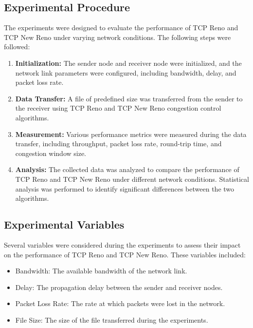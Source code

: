 \documentclass[11pt]{article}
\begin{document}
\subsection{Experimental Procedure}

The experiments were designed to evaluate the performance of TCP Reno and TCP New Reno under varying network conditions. The following steps were followed:

\begin{enumerate}
    \item \textbf{Initialization:} The sender node and receiver node were initialized, and the network link parameters were configured, including bandwidth, delay, and packet loss rate.
    
    \item \textbf{Data Transfer:} A file of predefined size was transferred from the sender to the receiver using TCP Reno and TCP New Reno congestion control algorithms.
    
    \item \textbf{Measurement:} Various performance metrics were measured during the data transfer, including throughput, packet loss rate, round-trip time, and congestion window size.
    
    \item \textbf{Analysis:} The collected data was analyzed to compare the performance of TCP Reno and TCP New Reno under different network conditions. Statistical analysis was performed to identify significant differences between the two algorithms.
\end{enumerate}

\subsection{Experimental Variables}

Several variables were considered during the experiments to assess their impact on the performance of TCP Reno and TCP New Reno. These variables included:

\begin{itemize}
    \item Bandwidth: The available bandwidth of the network link.
    \item Delay: The propagation delay between the sender and receiver nodes.
    \item Packet Loss Rate: The rate at which packets were lost in the network.
    \item File Size: The size of the file transferred during the experiments.
\end{itemize}
\end{document}
